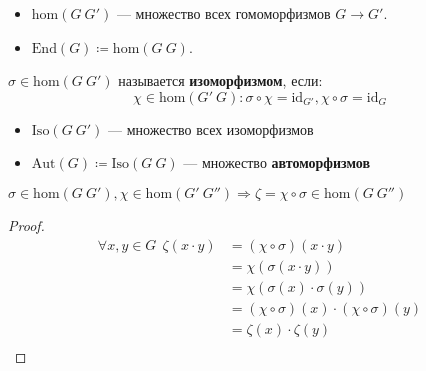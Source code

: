 \begin{notation}\itemfix
    \begin{itemize}
        \item \(\mathrm{hom}(G\ G')\) --- множество всех гомоморфизмов \(G \to G'\).
        \item \(\mathrm{End}(G) \coloneqq \mathrm{hom}(G\ G)\).
    \end{itemize}
\end{notation}

\begin{definition}
    \(\sigma \in \mathrm{hom}(G\ G')\) называется \textbf{изоморфизмом}, если:
    \[\chi \in \mathrm{hom}(G'\ G) : \sigma \circ \chi = \mathrm{id}_{G'}, \chi \circ \sigma = \mathrm{id}_G\]
\end{definition}

\begin{notation}\itemfix
    \begin{itemize}
        \item \(\mathrm{Iso}(G\ G')\) --- множество всех изоморфизмов
        \item \(\mathrm{Aut}(G) \coloneqq \mathrm{Iso}(G\ G)\) --- множество \textbf{автоморфизмов}
    \end{itemize}
\end{notation}

\begin{lemma}
    \(\sigma \in \mathrm{hom}(G\ G'), \chi \in \mathrm{hom}(G'\ G'') \Rightarrow \zeta = \chi \circ \sigma \in \mathrm{hom}(G\ G'')\)
\end{lemma}
\begin{proof}
    \begin{align*}
        \forall x, y \in G \ \ \zeta(x \cdot y) & = (\chi \circ \sigma) (x \cdot y)                      \\
                                                & = \chi(\sigma(x \cdot y))                              \\
                                                & = \chi(\sigma(x) \cdot \sigma(y))                      \\
                                                & = (\chi \circ \sigma) (x) \cdot (\chi \circ \sigma)(y) \\
                                                & = \zeta(x) \cdot \zeta(y)                              \\
    \end{align*}
\end{proof}

